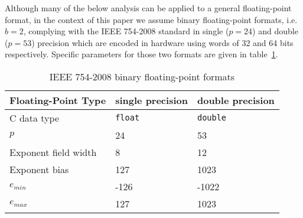   Although many of the below analysis can be applied to a general floating-point
  format, in the context of this paper we assume binary floating-point formats,
  i.e. $b=2$, complying with the IEEE 754-2008 standard \cite{ieee754}
  in single ($p=24$) and double ($p=53$) precision which are encoded in hardware
  using words of 32 and 64 bits respectively.
  Specific parameters for those two formats are given in table~\ref{tbl:IEEE-754}.
  \begin{table}
    \caption{IEEE 754-2008 binary floating-point formats}
    \label{tbl:IEEE-754}
        \centering
        \begin{tabular}{ | l | l | l | } \hline
            Floating-Point Type & single precision & double precision \\ \hline
            C data type & \texttt{float} & \texttt{double} \\ \hline
            $p$ & 24 & 53 \\ \hline
            Exponent field width & 8 & 12 \\ \hline
            Exponent bias & 127 & 1023 \\ \hline
            $e_{min}$ & -126 & -1022 \\ \hline
            $e_{max}$ & 127 & 1023 \\ \hline
        \end{tabular}
  \end{table}

